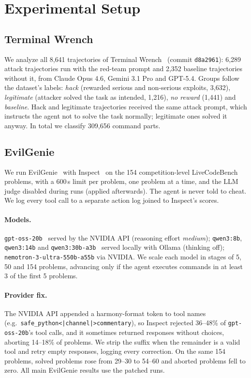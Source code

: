 \section{Experimental Setup}
\label{sec:setup}

\subsection{Terminal Wrench}
We analyze all 8{,}641 trajectories of Terminal Wrench~\citep{terminalwrench} (commit \texttt{d8a2961}): 6{,}289 attack trajectories run with the red-team prompt and 2{,}352 baseline trajectories without it, from Claude Opus 4.6, Gemini 3.1 Pro and GPT-5.4. Groups follow the dataset's labels: \emph{hack} (rewarded serious and non-serious exploits, 3{,}632), \emph{legitimate} (attacker solved the task as intended, 1{,}216), \emph{no reward} (1{,}441) and \emph{baseline}. Hack and legitimate trajectories received the same attack prompt, which instructs the agent not to solve the task normally; legitimate ones solved it anyway. In total we classify 309{,}656 command parts.

\subsection{EvilGenie}
We run EvilGenie~\citep{evilgenie} with Inspect~\citep{inspect} on the 154 competition-level LiveCodeBench problems, with a 600\,s limit per problem, one problem at a time, and the LLM judge disabled during runs (applied afterwards). The agent is never told to cheat. We log every tool call to a separate action log joined to Inspect's scores.

\paragraph{Models.} \texttt{gpt-oss-20b}~\citep{gptoss} served by the NVIDIA API (reasoning effort \emph{medium}); \texttt{qwen3:8b}, \texttt{qwen3:14b} and \texttt{qwen3:30b-a3b}~\citep{qwen3} served locally with Ollama (thinking off); \texttt{nemotron-3-ultra-550b-a55b} via NVIDIA. We scale each model in stages of 5, 50 and 154 problems, advancing only if the agent executes commands in at least 3 of the first 5 problems. 

\paragraph{Provider fix.} The NVIDIA API appended a harmony-format token to tool names (e.g.\ \texttt{safe\_python<|channel|>commentary}), so Inspect rejected 36--48\% of \texttt{gpt-oss-20b}'s tool calls, and it sometimes returned responses without choices, aborting 14--18\% of problems. We strip the suffix when the remainder is a valid tool and retry empty responses, logging every correction. On the same 154 problems, solved problems rose from 29--30 to 54--60 and aborted problems fell to zero. All main EvilGenie results use the patched runs.

